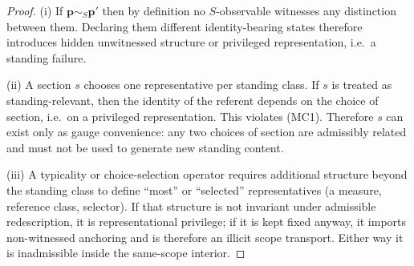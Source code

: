 \documentclass[11pt]{article}
\theoremstyle{remark}
\begin{document}
\begin{proof}
(i) If $\mathbf{p}\sim_S\mathbf{p}'$ then by definition no $S$-observable witnesses any distinction between them.
Declaring them different identity-bearing states therefore introduces hidden unwitnessed structure or privileged
representation, i.e.\ a standing failure.

(ii) A section $s$ chooses one representative per standing class. If $s$ is treated as standing-relevant, then the
identity of the referent depends on the choice of section, i.e.\ on a privileged representation. This violates
(MC1). Therefore $s$ can exist only as gauge convenience: any two choices of section are admissibly related and
must not be used to generate new standing content.

(iii) A typicality or choice-selection operator requires additional structure beyond the standing class to define
``most'' or ``selected'' representatives (a measure, reference class, selector).
If that structure is not invariant under admissible redescription, it is representational privilege; if it is
kept fixed anyway, it imports non-witnessed anchoring and is therefore an illicit scope transport.
Either way it is inadmissible inside the same-scope interior.
\end{proof}
\end{document}
